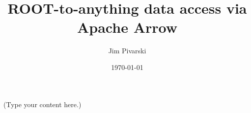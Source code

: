 \documentclass{article}
\title{ROOT-to-anything data access via Apache Arrow}
\author{Jim Pivarski}
\date{\today}
\begin{document}
\maketitle

(Type your content here.)
\end{document}

